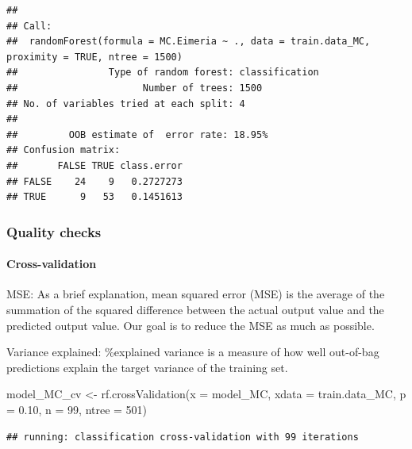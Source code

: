 \documentclass[
]{article}
\newenvironment{Shaded}{\begin{snugshade}}{\end{snugshade}}
\newcommand{\AttributeTok}[1]{\textcolor[rgb]{0.77,0.63,0.00}{#1}}
\newcommand{\DecValTok}[1]{\textcolor[rgb]{0.00,0.00,0.81}{#1}}
\newcommand{\FloatTok}[1]{\textcolor[rgb]{0.00,0.00,0.81}{#1}}
\newcommand{\FunctionTok}[1]{\textcolor[rgb]{0.00,0.00,0.00}{#1}}
\newcommand{\NormalTok}[1]{#1}
\newcommand{\OtherTok}[1]{\textcolor[rgb]{0.56,0.35,0.01}{#1}}
\newcommand{\SpecialCharTok}[1]{\textcolor[rgb]{0.00,0.00,0.00}{#1}}
\begin{document}
\begin{verbatim}
## 
## Call:
##  randomForest(formula = MC.Eimeria ~ ., data = train.data_MC,      proximity = TRUE, ntree = 1500) 
##                Type of random forest: classification
##                      Number of trees: 1500
## No. of variables tried at each split: 4
## 
##         OOB estimate of  error rate: 18.95%
## Confusion matrix:
##       FALSE TRUE class.error
## FALSE    24    9   0.2727273
## TRUE      9   53   0.1451613
\end{verbatim}

\hypertarget{quality-checks-1}{%
\subsubsection{Quality checks}\label{quality-checks-1}}

\hypertarget{cross-validation-3}{%
\paragraph{Cross-validation}\label{cross-validation-3}}

MSE: As a brief explanation, mean squared error (MSE) is the average of
the summation of the squared difference between the actual output value
and the predicted output value. Our goal is to reduce the MSE as much as
possible.

Variance explained: \%explained variance is a measure of how well
out-of-bag predictions explain the target variance of the training set.

\begin{Shaded}
\begin{Highlighting}[]
\NormalTok{model\_MC\_cv }\OtherTok{\textless{}{-}} \FunctionTok{rf.crossValidation}\NormalTok{(}\AttributeTok{x =}\NormalTok{ model\_MC, }\AttributeTok{xdata =}  
\NormalTok{                                          train.data\_MC, }
                                    \AttributeTok{p =} \FloatTok{0.10}\NormalTok{, }\AttributeTok{n =} \DecValTok{99}\NormalTok{, }\AttributeTok{ntree =} \DecValTok{501}\NormalTok{)}
\end{Highlighting}
\end{Shaded}

\begin{verbatim}
## running: classification cross-validation with 99 iterations
\end{verbatim}

\begin{Shaded}
\end{Shaded}
\end{document}

